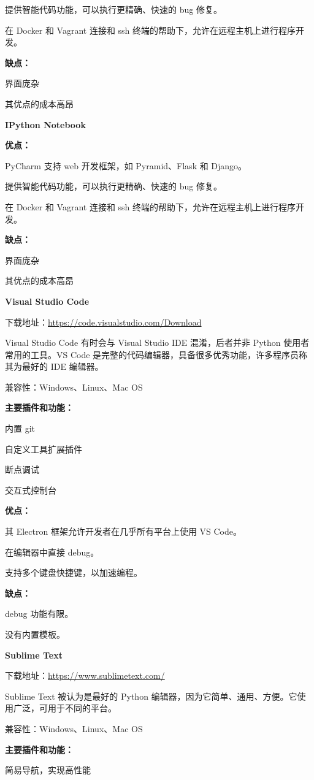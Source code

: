 \documentclass[]{ctexbook}
\begin{document}
提供智能代码功能，可以执行更精确、快速的 bug 修复。

在 Docker 和 Vagrant 连接和 ssh 终端的帮助下，允许在远程主机上进行程序开发。

\textbf{缺点：}

界面庞杂

其优点的成本高昂

\textbf{IPython Notebook}

\textbf{优点：}

PyCharm 支持 web 开发框架，如 Pyramid、Flask 和 Django。

提供智能代码功能，可以执行更精确、快速的 bug 修复。

在 Docker 和 Vagrant 连接和 ssh 终端的帮助下，允许在远程主机上进行程序开发。

\textbf{缺点：}

界面庞杂

其优点的成本高昂

\textbf{Visual Studio Code}

下载地址：\url{https://code.visualstudio.com/Download}

Visual Studio Code 有时会与 Visual Studio IDE 混淆，后者并非 Python 使用者常用的工具。VS Code 是完整的代码编辑器，具备很多优秀功能，许多程序员称其为最好的 IDE 编辑器。

兼容性：Windows、Linux、Mac OS

\textbf{主要插件和功能：}

内置 git

自定义工具扩展插件

断点调试

交互式控制台

\textbf{优点：}

其 Electron 框架允许开发者在几乎所有平台上使用 VS Code。

在编辑器中直接 debug。

支持多个键盘快捷键，以加速编程。

\textbf{缺点：}

debug 功能有限。

没有内置模板。

\textbf{Sublime Text}

下载地址：\url{https://www.sublimetext.com/}

Sublime Text 被认为是最好的 Python 编辑器，因为它简单、通用、方便。它使用广泛，可用于不同的平台。

兼容性：Windows、Linux、Mac OS

\textbf{主要插件和功能：}

简易导航，实现高性能
\end{document}
